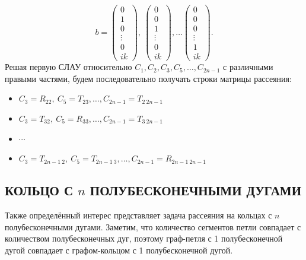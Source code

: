 \documentclass[a4 paper, 12 pt]{extarticle}
\begin{document}
   \[b = \left(\begin{smallmatrix}
   0 \\
   1 \\
   0 \\
   \vdots \\
   0 \\
   ik
   \end{smallmatrix}\right), \ 
   \left(\begin{smallmatrix}
   0 \\
   0 \\
   1 \\
   \vdots \\
   0 \\
   ik
   \end{smallmatrix}\right), \ldots
   \left(\begin{smallmatrix}
   0 \\
   0 \\
   0 \\
   \vdots \\
   1 \\
   ik
   \end{smallmatrix}\right).
   \]
   Решая первую СЛАУ относительно $C_1, C_2, C_3, C_5, \ldots, C_{2n-1}$ с различными правыми частями, будем последовательно получать строки матрицы рассеяния: 
   
   \begin{itemize}
   	\item $C_3 = R_{22}, \ C_5 = T_{23}, \ldots, C_{2n-1} = T_{2 \ 2n-1}$ 
   	\item $C_3 = T_{32}, \ C_5 = R_{33}, \ldots, C_{2n-1} = T_{3 \ 2n-1} $
   	\item $\cdots$ 
   	\item $C_3 = T_{2n-1 \ 2}, \ C_5 = T_{2n-1 \ 3}, \ldots, C_{2n-1} = R_{2n-1 \  2n-1}$ 
   \end{itemize}
    
   \subsection{КОЛЬЦО С $n$ ПОЛУБЕСКОНЕЧНЫМИ ДУГАМИ}
   Также определённый интерес представляет задача рассеяния на кольцах с $n$ полубесконечными дугами. Заметим, что количество сегментов петли совпадает с количеством полубесконечных дуг, поэтому граф-петля с 1 полубесконечной дугой совпадает с графом-кольцом с 1 полубесконечной дугой.
   
\end{document}
